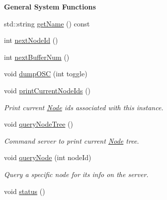 \begin{Indent}{\bf General System Functions}\par
\begin{DoxyCompactItemize}
\item 
std\-::string \hyperlink{classsc_1_1SCServer_a663f38241749842d676f29463edb9c22}{get\-Name} () const 
\item 
int \hyperlink{classsc_1_1SCServer_ad1194f90f47d7ce50390953bd785b75b}{next\-Node\-Id} ()
\item 
int \hyperlink{classsc_1_1SCServer_aec43a53cc18c49dae4066b4bf85e2067}{next\-Buffer\-Num} ()
\item 
void \hyperlink{classsc_1_1SCServer_ada96ef4c5ea8747899a6db947ec33363}{dump\-O\-S\-C} (int toggle)
\item 
\hypertarget{classsc_1_1SCServer_ac884ae7c3f2791f6b959818c8c2fbe10}{void \hyperlink{classsc_1_1SCServer_ac884ae7c3f2791f6b959818c8c2fbe10}{print\-Current\-Node\-Ids} ()}\label{classsc_1_1SCServer_ac884ae7c3f2791f6b959818c8c2fbe10}

\begin{DoxyCompactList}\small\item\em Print current \hyperlink{classsc_1_1Node}{Node} ids associated with this instance. \end{DoxyCompactList}\item 
\hypertarget{classsc_1_1SCServer_ad057f9ca7dab818c259f95f41e3a575e}{void \hyperlink{classsc_1_1SCServer_ad057f9ca7dab818c259f95f41e3a575e}{query\-Node\-Tree} ()}\label{classsc_1_1SCServer_ad057f9ca7dab818c259f95f41e3a575e}

\begin{DoxyCompactList}\small\item\em Command server to print current \hyperlink{classsc_1_1Node}{Node} tree. \end{DoxyCompactList}\item 
\hypertarget{classsc_1_1SCServer_a775f079ad6a09282356ae161b186e345}{void \hyperlink{classsc_1_1SCServer_a775f079ad6a09282356ae161b186e345}{query\-Node} (int node\-Id)}\label{classsc_1_1SCServer_a775f079ad6a09282356ae161b186e345}

\begin{DoxyCompactList}\small\item\em Query a specific node for its info on the server. \end{DoxyCompactList}\item 
\hypertarget{classsc_1_1SCServer_a9418167a772b6f0f4495c262938277b9}{void \hyperlink{classsc_1_1SCServer_a9418167a772b6f0f4495c262938277b9}{status} ()}\label{classsc_1_1SCServer_a9418167a772b6f0f4495c262938277b9}


\end{DoxyCompactItemize}
\end{Indent}
